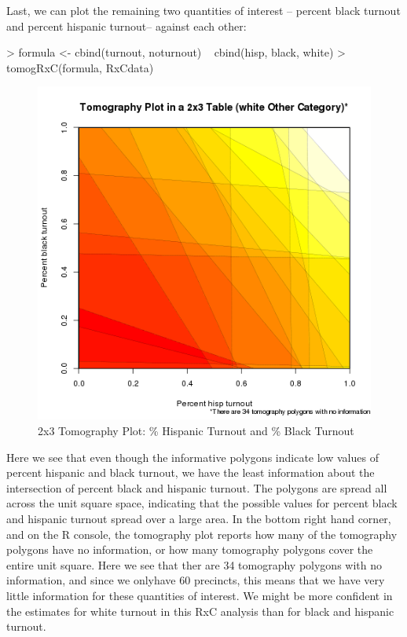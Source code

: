 \documentclass[11pt,oneside,letterpaper,titlepage]{article}
\begin{document}
\clearpage
Last, we can plot the remaining two quantities of interest -- percent black turnout and percent hispanic turnout-- against each other:

\begin{Schunk}
\begin{Sinput}
> formula <- cbind(turnout, noturnout) ~ cbind(hisp, black, white)
> tomogRxC(formula, RxCdata)
\end{Sinput}
\end{Schunk}

\begin{figure}[Ht]
\begin{center}
\includegraphics{hispblackRxC.png} 
\end{center}
\caption{2x3 Tomography Plot: \% Hispanic Turnout and \% Black Turnout}
\end{figure}


Here we see that even though the informative polygons indicate low values of percent hispanic and black turnout, we have the least information about the intersection of percent black and hispanic turnout. The polygons are spread all across the unit square space, indicating that the possible values for percent black and hispanic turnout spread over a large area.  In the bottom right hand corner, and on the R console, the tomography plot reports how many of the tomography polygons have no information, or how many tomography polygons cover the entire unit square.  Here we see that ther are 34 tomography polygons with no information, and since we onlyhave 60 precincts, this means that we have very little information for these quantities of interest. We might be more confident in the estimates for white turnout in this RxC analysis than for black and hispanic turnout.
\end{document}

